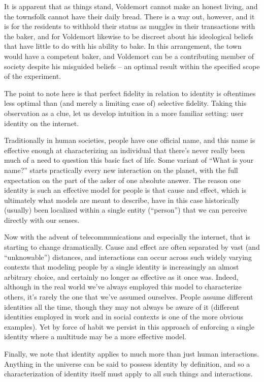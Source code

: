 \documentclass[pra,twocolumn,groupedaddress,10pt]{revtex4}
\theoremstyle{definition}
\begin{document}
It is apparent that as things stand, Voldemort cannot make an honest living, and the townsfolk cannot have their daily bread. There is a way out, however, and it is for the residents to withhold their status as muggles in their transactions with the baker, and for Voldemort likewise to be discreet about his ideological beliefs that have little to do with his ability to bake. In this arrangement, the town would have a competent baker, and Voldemort can be a contributing member of society despite his misguided beliefs -- an optimal result within the specified scope of the experiment.

The point to note here is that perfect fidelity in relation to identity is oftentimes less optimal than (and merely a limiting case of) selective fidelity. Taking this observation as a clue, let us develop intuition in a more familiar setting: user identity on the internet.

Traditionally in human societies, people have one official name, and this name is effective enough at characterizing an individual that there's never really been much of a need to question this basic fact of life. Some variant of ``What is your name?'' starts practically every new interaction on the planet, with the full expectation on the part of the asker of one absolute answer. The reason one identity is such an effective model for people is that cause and effect, which is ultimately what models are meant to describe, have in this case historically (usually) been localized within a single entity (``person'') that we can perceive directly with our senses.

Now with the advent of telecommunications and especially the internet, that is starting to change dramatically. Cause and effect are often separated by vast (and ``unknowable'') distances, and interactions can occur across such widely varying contexts that modeling people by a single identity is increasingly an almost arbitrary choice, and certainly no longer as effective as it once was. Indeed, although in the real world we've always employed this model to characterize others, it's rarely the one that we've assumed ourselves. People assume different identities all the time, though they may not always be aware of it (different identities employed in work and in social contexts is one of the more obvious examples). Yet by force of habit we persist in this approach of enforcing a single identity where a multitude may be a more effective model.

Finally, we note that identity applies to much more than just human interactions. Anything in the universe can be said to possess identity by definition, and so a characterization of identity itself must apply to all such things and interactions.
\end{document}
